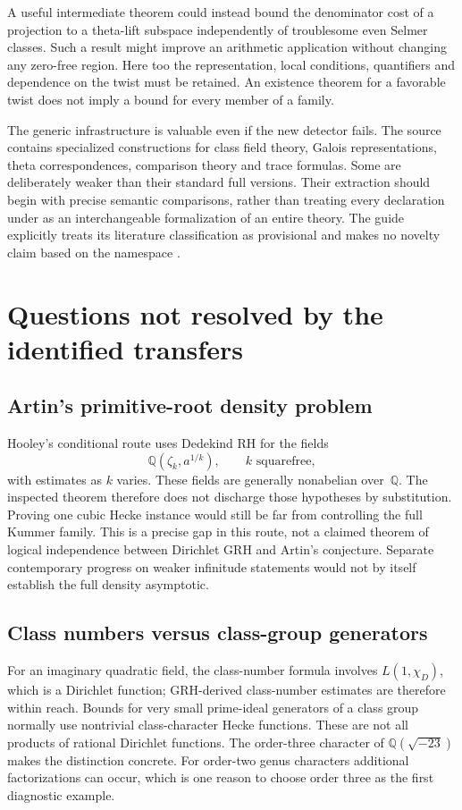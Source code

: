 \documentclass[11pt,letterpaper]{article}
\theoremstyle{definition}\newtheorem{definition}[theorem]{Definition}
\theoremstyle{remark}\newtheorem{remark}[theorem]{Remark}
\newcommand{\Q}{\mathbb Q}\newcommand{\R}{\mathbb R}\newcommand{\C}{\mathbb C}
\begin{document}
A useful intermediate theorem could instead bound the denominator cost of a projection to a
theta-lift subspace independently of troublesome even Selmer classes. Such a result might
improve an arithmetic application without changing any zero-free region. Here too the
representation, local conditions, quantifiers and dependence on the twist must be retained.
An existence theorem for a favorable twist does not imply a bound for every member of a family.

The generic infrastructure is valuable even if the new detector fails. The source contains
specialized constructions for class field theory, Galois representations, theta correspondences,
comparison theory and trace formulas. Some are deliberately weaker than their standard full
versions. Their extraction should begin with precise semantic comparisons, rather than treating
every declaration under  as an interchangeable formalization of an entire theory.
The guide explicitly treats its literature classification as provisional and makes no novelty
claim based on the namespace .\cite{guide}

\section{Questions not resolved by the identified transfers}\label{sec:limits}
\subsection{Artin's primitive-root density problem}
Hooley's conditional route uses Dedekind RH for the fields
\[
 \Q(\zeta_k,a^{1/k}),\qquad k\text{ squarefree},
\]
with estimates as $k$ varies. These fields are generally nonabelian over~$\Q$.
The inspected theorem therefore does not discharge those hypotheses by substitution.
Proving one cubic Hecke instance would still be far from controlling the full Kummer family.
This is a precise gap in this route, not a claimed theorem of logical independence between
Dirichlet GRH and Artin's conjecture. Separate contemporary progress on weaker infinitude
statements would not by itself establish the full density asymptotic.\cite{perucca}

\subsection{Class numbers versus class-group generators}
For an imaginary quadratic field, the class-number formula involves
$L(1,\chi_D)$, which is a Dirichlet function; GRH-derived class-number estimates are therefore
within reach. Bounds for very small prime-ideal generators of a class group normally use
nontrivial class-character Hecke functions. These are not all products of rational Dirichlet
functions. The order-three character of $\Q(\sqrt{-23})$ makes the distinction concrete.
For order-two genus characters additional factorizations can occur, which is one reason
to choose order three as the first diagnostic example.
\end{document}
